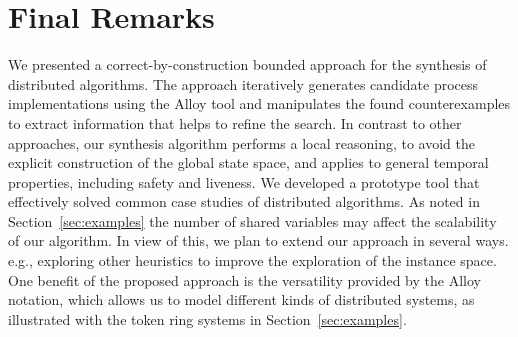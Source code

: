 \section{Final Remarks}
\label{sec:conclusions}

We presented a correct-by-construction bounded approach for the synthesis of distributed algorithms. The approach iteratively generates candidate process implementations using the Alloy tool and manipulates the found counterexamples to extract information that helps to refine  the search. In contrast to other approaches, our synthesis algorithm performs a local reasoning, to avoid the explicit construction of the global state space, and applies to general temporal properties, including safety and liveness. We developed a prototype tool that effectively solved common case studies of distributed algorithms. As noted in Section~\ref{sec:examples} the number of shared variables may affect the scalability of our algorithm. In view of this, we plan to extend our approach in several ways. e.g.,  exploring other heuristics to improve the exploration of the instance space.  One benefit of the proposed approach is the versatility provided by the Alloy notation, which allows us to model different kinds of distributed systems, as illustrated with the token ring systems in Section~\ref{sec:examples}.



